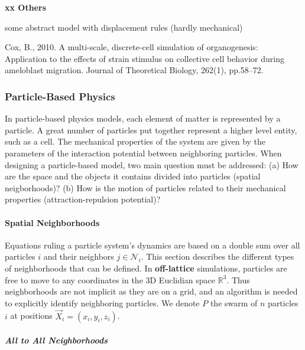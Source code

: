 \textbf{xx Others}

  some abstract model with displacement rules \cite{Robertson:2007da} (hardly mechanical) 

  Cox, B., 2010. A multi-scale, discrete-cell simulation of organogenesis: Application to the effects of strain stimulus on collective cell behavior during ameloblast migration. Journal of Theoretical Biology, 262(1), pp.58–72. \cite{Cox:2010ep}


\subsubsection{Particle-Based Physics}


In particle-based physics models, each element of matter is represented by a particle. A great number of particles put together represent a higher level entity, such as a cell. The mechanical properties of the system are given by the parameters of the interaction potential between neighboring particles. When designing a particle-based model, two main question must be addressed: (a) How are the space and the objects it contains divided into particles (spatial neigborhoods)? (b) How is the motion of particles related to their mechanical properties (attraction-repulsion potential)?


\paragraph{Spatial Neighborhoods}


Equations ruling a particle system's dynamics are based on a double sum over all particles $i$ and their neighbors $j \in \mathcal{N}_i$. This section describes the different types of neighborhoods that can be defined. In \textbf{off-lattice} simulations, particles are free to move to any coordinates in the 3D Euclidian space $\mathbb{R}^{3}$. Thus neighborhoods are not implicit as they are on a grid, and an algorithm is needed to explicitly identify neighboring particles. We denote $P$ the swarm of $n$ particles $i$ at positions $\vec{X}_i = (x_i, y_i, z_i)$.

\subparagraph{All to All Neighborhoods}

